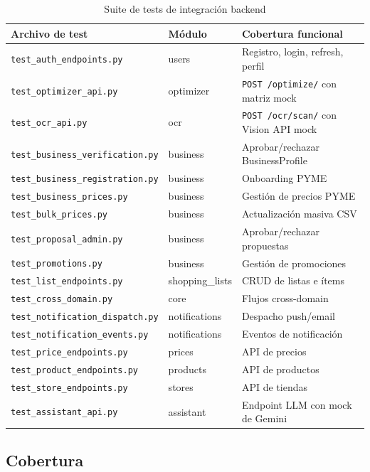 \begin{table}[htbp]
\centering
\caption{Suite de tests de integraci\'on backend}
\label{tab:tests-integracion}
\small
\begin{tabular}{@{}lll@{}}
\toprule
\textbf{Archivo de test} & \textbf{M\'odulo} & \textbf{Cobertura funcional} \\
\midrule
\texttt{test\_auth\_endpoints.py} & users & Registro, login, refresh, perfil \\
\texttt{test\_optimizer\_api.py} & optimizer & \texttt{POST /optimize/} con matriz mock \\
\texttt{test\_ocr\_api.py} & ocr & \texttt{POST /ocr/scan/} con Vision API mock \\
\texttt{test\_business\_verification.py} & business & Aprobar/rechazar BusinessProfile \\
\texttt{test\_business\_registration.py} & business & Onboarding PYME \\
\texttt{test\_business\_prices.py} & business & Gesti\'on de precios PYME \\
\texttt{test\_bulk\_prices.py} & business & Actualizaci\'on masiva CSV \\
\texttt{test\_proposal\_admin.py} & business & Aprobar/rechazar propuestas \\
\texttt{test\_promotions.py} & business & Gesti\'on de promociones \\
\texttt{test\_list\_endpoints.py} & shopping\_lists & CRUD de listas e \'items \\
\texttt{test\_cross\_domain.py} & core & Flujos cross-domain \\
\texttt{test\_notification\_dispatch.py} & notifications & Despacho push/email \\
\texttt{test\_notification\_events.py} & notifications & Eventos de notificaci\'on \\
\texttt{test\_price\_endpoints.py} & prices & API de precios \\
\texttt{test\_product\_endpoints.py} & products & API de productos \\
\texttt{test\_store\_endpoints.py} & stores & API de tiendas \\
\texttt{test\_assistant\_api.py} & assistant & Endpoint LLM con mock de Gemini \\
\bottomrule
\end{tabular}
\end{table}

\subsection{Cobertura}\label{subsec:cobertura}

